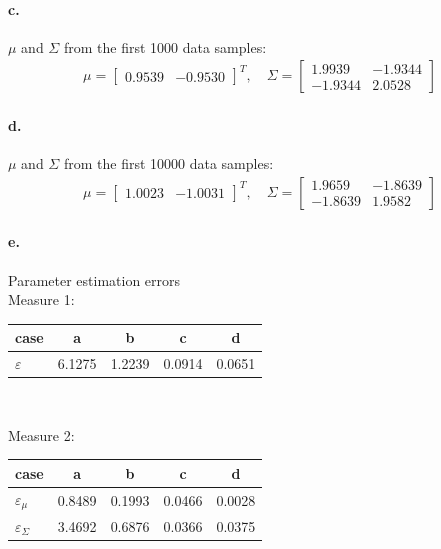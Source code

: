 \documentclass[a4paper]{article}
\begin{document}
\paragraph{c.} $\mu$ and $\Sigma$ from the first 1000 data samples: \\
\begin{align*}
	\mu = \begin{bmatrix}
		0.9539 & -0.9530
	\end{bmatrix}^{T}, \quad
	\Sigma = \begin{bmatrix}
		 1.9939  & -1.9344 \\
		-1.9344  &  2.0528
	\end{bmatrix}
\end{align*}

\paragraph{d.} $\mu$ and $\Sigma$ from the first 10000 data samples: \\
\begin{align*}
	\mu = \begin{bmatrix}
		1.0023 & -1.0031
	\end{bmatrix}^{T}, \quad
	\Sigma = \begin{bmatrix}
		 1.9659  & -1.8639 \\
		-1.8639  &  1.9582
	\end{bmatrix}
\end{align*}

\paragraph{e.} Parameter estimation errors \\

Measure 1:
	\begin{tabular}{l *{4}{c}}
			case      &   a    &   b    &   c    &   d    \\ \hline
		$\varepsilon$ & 6.1275 & 1.2239 & 0.0914 & 0.0651
	\end{tabular} \\
\vspace{2em}
 
Measure 2: 
	\begin{tabular}{l *{4}{c}}
				case            &   a    &   b    &   c    &   d    \\ \hline
		$\varepsilon _{\mu}$    & 0.8489 & 0.1993 & 0.0466 & 0.0028 \\ 
		$\varepsilon _{\Sigma}$ & 3.4692 & 0.6876 & 0.0366 & 0.0375 
	\end{tabular} \\
\vspace{2em}
\end{document}
